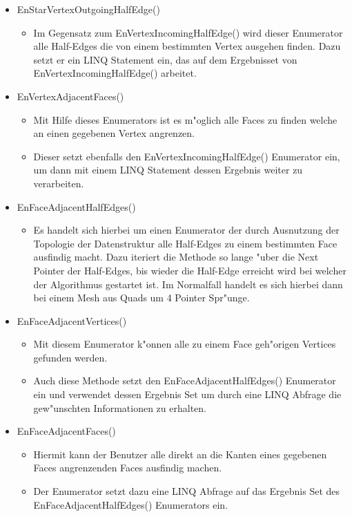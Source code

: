 \documentclass[pagesize, paper=a4, fontsize=12pt,titlepage=true, headings=small, headnosepline, abstractoff, liststotoc, nochapterprefix, plainheadsepline]{scrreprt}
\begin{document}
\begin{itemize}
\item EnStarVertexOutgoingHalfEdge()
	\begin{itemize}
	\item Im Gegensatz zum EnVertexIncomingHalfEdge() wird dieser Enumerator alle Half-Edges die von einem bestimmten Vertex ausgehen finden. Dazu setzt er ein LINQ Statement ein, das auf dem Ergebnisset von EnVertexIncomingHalfEdge() arbeitet.
	\end{itemize}
\item EnVertexAdjacentFaces()
	\begin{itemize}
	\item Mit Hilfe dieses Enumerators ist es m"oglich alle Faces zu finden welche an einen gegebenen Vertex angrenzen.
	\item Dieser setzt ebenfalls den EnVertexIncomingHalfEdge() Enumerator ein, um dann mit einem LINQ Statement dessen Ergebnis weiter zu verarbeiten.
	\end{itemize}
\item EnFaceAdjacentHalfEdges()
	\begin{itemize}
	\item Es handelt sich hierbei um einen Enumerator der durch Ausnutzung der Topologie der Datenstruktur alle Half-Edges zu einem bestimmten Face ausfindig macht. Dazu iteriert die Methode so lange "uber die Next Pointer der Half-Edges, bis wieder die Half-Edge erreicht wird bei welcher der Algorithmus gestartet ist. Im Normalfall handelt es sich hierbei dann bei einem Mesh aus Quads um 4 Pointer Spr"unge.
	\end{itemize}
\item EnFaceAdjacentVertices()
	\begin{itemize}
	\item Mit diesem Enumerator k"onnen alle zu einem Face geh"origen Vertices gefunden werden.
	\item Auch diese Methode setzt den EnFaceAdjacentHalfEdges() Enumerator ein und verwendet dessen Ergebnis Set um durch eine LINQ Abfrage die gew"unschten Informationen zu erhalten.
	\end{itemize}
\item EnFaceAdjacentFaces()
	\begin{itemize}
	\item Hiermit kann der Benutzer alle direkt an die Kanten eines gegebenen Faces angrenzenden Faces ausfindig machen.
	\item Der Enumerator setzt dazu eine LINQ Abfrage auf das Ergebnis Set des EnFaceAdjacentHalfEdges() Enumerators ein. 
	\end{itemize}
\end{itemize}
\end{document}
